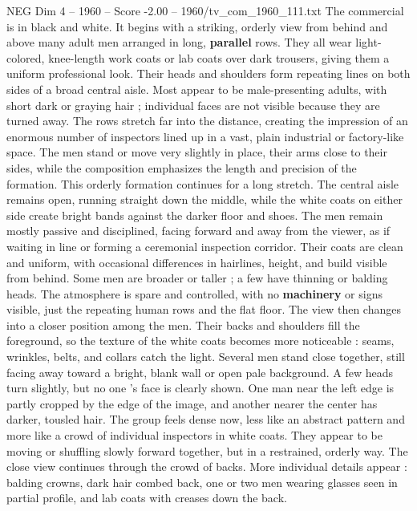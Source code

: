 \begin{textsample}{NEG Dim 4 – 1960 – Score -2.00 – 1960/tv\_com\_1960\_111.txt}  \label{ex:f4_neg_031}
The commercial is in black and white.
It begins with a striking, orderly view from behind and above many adult men arranged in long, \textbf{parallel} rows.
They all wear light-colored, knee-length work coats or lab coats over dark trousers, giving them a uniform professional look.
Their heads and shoulders form repeating lines on both sides of a broad central aisle.
Most appear to be male-presenting adults, with short dark or graying hair ; individual faces are not visible because they are turned away.
The rows stretch far into the distance, creating the impression of an enormous number of inspectors lined up in a vast, plain industrial or factory-like space.
The men stand or move very slightly in place, their arms close to their sides, while the composition emphasizes the length and precision of the formation.
This orderly formation continues for a long stretch.
The central aisle remains open, running straight down the middle, while the white coats on either side create bright bands against the darker floor and shoes.
The men remain mostly passive and disciplined, facing forward and away from the viewer, as if waiting in line or forming a ceremonial inspection corridor.
Their coats are clean and uniform, with occasional differences in hairlines, height, and build visible from behind.
Some men are broader or taller ; a few have thinning or balding heads.
The atmosphere is spare and controlled, with no \textbf{machinery} or signs visible, just the repeating human rows and the flat floor.
The view then changes into a closer position among the men.
Their backs and shoulders fill the foreground, so the texture of the white coats becomes more noticeable : seams, wrinkles, belts, and collars catch the light.
Several men stand close together, still facing away toward a bright, blank wall or open pale background.
A few heads turn slightly, but no one ’s face is clearly shown.
One man near the left edge is partly cropped by the edge of the image, and another nearer the center has darker, tousled hair.
The group feels dense now, less like an abstract pattern and more like a crowd of individual inspectors in white coats.
They appear to be moving or shuffling slowly forward together, but in a restrained, orderly way.
The close view continues through the crowd of backs.
More individual details appear : balding crowns, dark hair combed back, one or two men wearing glasses seen in partial profile, and lab coats with creases down the back.

\end{textsample}
